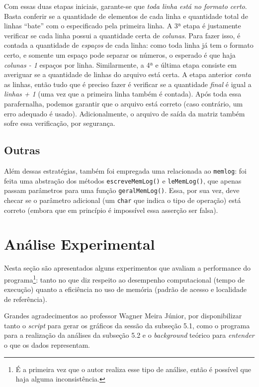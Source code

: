 \documentclass{article}
\def\code#1{\texttt{#1}}
\begin{document}
Com essas duas etapas iniciais, garante-se que \textit{toda linha está no formato certo}. Basta conferir se a quantidade de elementos de cada linha e quantidade total de linhas ``bate'' com o especificado pela primeira linha. A 3ª etapa é justamente verificar se cada linha possui a quantidade certa de \textit{colunas}. Para fazer isso, é contada a quantidade de \textit{espaços} de cada linha: como toda linha já tem o formato certo, e somente um espaço pode separar os números, o esperado é que haja \textit{colunas - 1} espaços por linha. Similarmente, a 4ª e última etapa consiste em averiguar se a quantidade de linhas do arquivo está certa. A etapa anterior \textit{conta} as linhas, então tudo que é preciso fazer é verificar se a quantidade \textit{final} é igual a \textit{linhas + 1} (uma vez que a primeira linha também é contada). Após toda essa parafernalha, podemos garantir que o arquivo está correto (caso contrário, um erro adequado é usado). Adicionalmente, o arquivo de saída da matriz também sofre essa verificação, por segurança.

\subsection{Outras}

Além dessas estratégias, também foi empregada uma relacionada ao \code{memlog}: foi feita uma abstração dos métodos \code{escreveMemLog()} e \code{leMemLog()}, que apenas passam parâmetros para uma função \code{geralMemLog()}. Essa, por sua vez, deve checar se o parâmetro adicional (um \code{char} que indica o tipo de operação) está correto (embora que em princípio é impossível essa asserção ser falsa).

\section{Análise Experimental}

Nesta seção são apresentados alguns experimentos que avaliam a performance do programa\footnote{É a primeira vez que o autor realiza esse tipo de análise, então é possível que haja alguma inconsistência.}: tanto no que diz respeito ao desempenho computacional (tempo de execução) quanto a eficiência no uso de memória (padrão de acesso e localidade de referência). 

Grandes agradecimentos ao professor Wagner Meira Júnior, por disponibilizar tanto o \textit{script} para gerar os gráficos da sessão da subseção 5.1, como o programa para a realização da análises da subseção 5.2 e o \textit{background} teórico para \textit{entender} o que os dados representam.
\end{document}
